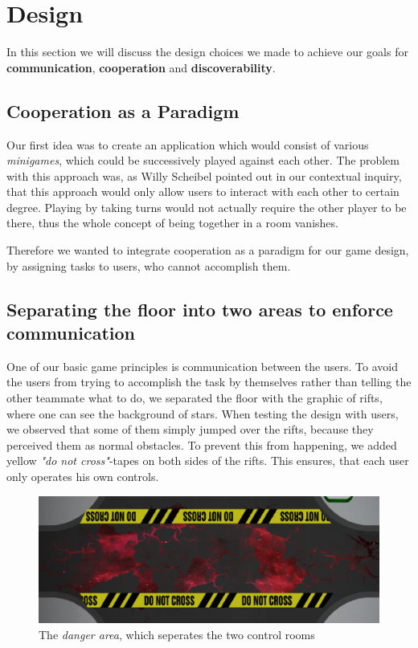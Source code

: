 \documentclass{sigchi}
\begin{document}
\section{Design}
\vspace{1mm}
In this section we will discuss the design choices we made to achieve our goals for \textbf{communication}, \textbf{cooperation} and \textbf{discoverability}.

\subsection{Cooperation as a Paradigm}
\vspace{1mm}
Our first idea was to create an application which would consist of various \textit{minigames}, which could be successively played against each other. The problem with this approach was, as Willy Scheibel pointed out in our contextual inquiry, that this approach would only allow users to interact with each other to certain degree. Playing by taking turns would not actually require the other player to be there, thus the whole concept of being together in a room vanishes. 

Therefore we wanted to integrate cooperation as a paradigm for our game design, by assigning tasks to users, who cannot accomplish them.

\subsection{Separating the floor into two areas to enforce communication}
\vspace{1mm}
One of our basic game principles is communication between the users. To avoid the users from trying to accomplish the task by themselves rather than telling the other teammate what to do, we separated the floor with the graphic of rifts, where one can see the background of stars. When testing the design with users, we observed that some of them simply jumped over the rifts, because they perceived them as normal obstacles. To prevent this from happening, we added yellow \textit{"do not cross"}-tapes on both sides of the rifts. This ensures, that each user only operates his own controls.

\begin{figure}[H]
\centering
\includegraphics[width=0.99\columnwidth]{dangerarea}
\caption{The \textit{danger area}, which seperates the two control rooms}
\label{fig:gamingArea}
\end{figure}
\end{document}
